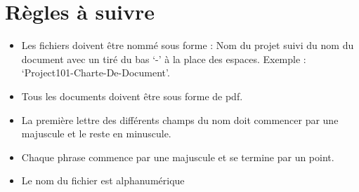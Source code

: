 \documentclass[11pt,fleqn]{book} %
\begin{document}
\section{ Règles à suivre}
\begin{itemize}
    \item  Les fichiers doivent être nommé sous forme : Nom du projet suivi du nom du document avec un tiré du bas ‘-’ à la place des espaces. Exemple : ‘Project101-Charte-De-Document’.
    \item Tous les documents doivent être sous forme de pdf.
    \item La première lettre des différents champs du nom doit commencer par une majuscule et le reste en minuscule.
    \item Chaque phrase commence par une majuscule et se termine par un point.
    \item Le nom du fichier est alphanumérique
\end{itemize}
\end{document}
